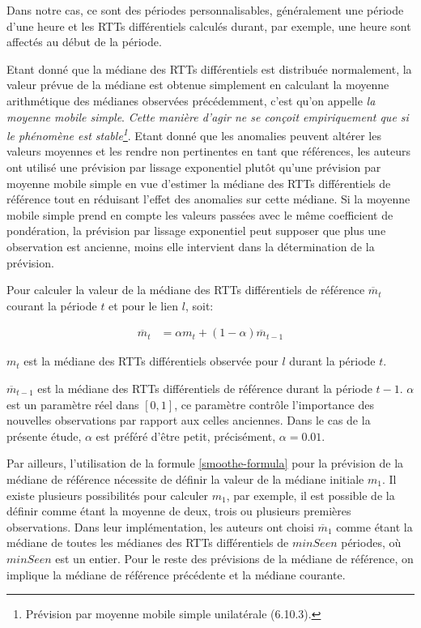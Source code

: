 Dans notre cas, ce sont des périodes personnalisables, généralement une période d'une heure et les RTTs différentiels calculés durant, par exemple, une heure sont affectés au début de la période.

Etant donné que la médiane des RTTs différentiels est distribuée normalement,  la valeur prévue de la médiane est obtenue simplement en calculant la moyenne arithmétique des médianes observées précédemment, c'est qu'on appelle \textit{la moyenne mobile simple}. \textit{Cette manière d'agir ne se conçoit empiriquement que si le phénomène est stable\footnote{Prévision par moyenne mobile simple unilatérale (6.10.3)\cite{elementdestatistiques}.}}.
Etant donné que les anomalies peuvent altérer les valeurs moyennes et les rendre non pertinentes en tant que références, les auteurs ont utilisé    une prévision par lissage exponentiel 
plutôt qu'une prévision par moyenne mobile simple  en vue d'estimer la médiane des RTTs différentiels de référence tout en réduisant l'effet des anomalies sur cette médiane.
Si  la moyenne mobile simple  prend en compte les valeurs passées avec le même coefficient de pondération,  la prévision par lissage exponentiel peut supposer que plus une observation est ancienne, moins elle intervient dans la détermination de la prévision. 

Pour calculer la  valeur de la médiane des RTTs différentiels de référence $ \overline{m}_{t}$   courant la période $ t $ et pour le lien $l$, soit:

\begin{align}
	 \overline{m}_{t}& =  \alpha {m}_{t} + (1-  \alpha) \overline{m}_{t-1} \label{smoothe-formula}
\end{align} 

$m_t$ est la médiane des RTTs différentiels observée pour $l$ durant la période $t$. 

$ \overline{m}_{t-1}$  est la médiane des  RTTs différentiels  de référence durant la période $ t-1 $.  
$\alpha$ est un paramètre réel dans $[0,1]$, ce paramètre contrôle l'importance des nouvelles observations par rapport aux celles anciennes. Dans le cas de la présente étude, $\alpha$ est préféré d'être petit, précisément, $ \alpha = 0.01$.

Par ailleurs, l'utilisation de la formule \ref{smoothe-formula} pour la prévision de la médiane de référence nécessite de définir la valeur de la médiane initiale $ {m}_{1}$. Il existe plusieurs possibilités pour calculer $ {m}_{1}$, par exemple, il est possible de la définir comme étant la moyenne de deux, trois ou plusieurs premières observations. Dans leur implémentation, les auteurs ont choisi $\overline{m}_{1}$ comme étant la médiane de toutes les médianes des RTTs différentiels de $minSeen$  périodes, où $minSeen$ est un entier. Pour le reste des prévisions de la médiane de référence, on implique la médiane de référence précédente et  la médiane courante.

